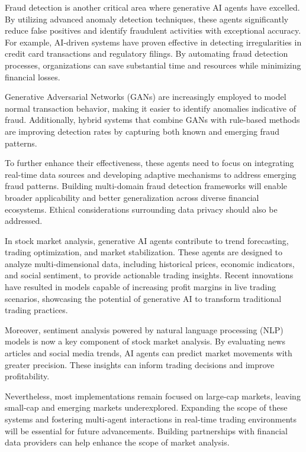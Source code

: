 \documentclass[a4paper,12pt]{scrbook}
\begin{document}
	Fraud detection is another critical area where generative AI agents have excelled. By utilizing advanced anomaly detection techniques, these agents significantly reduce false positives and identify fraudulent activities with exceptional accuracy. For example, AI-driven systems have proven effective in detecting irregularities in credit card transactions and regulatory filings. By automating fraud detection processes, organizations can save substantial time and resources while minimizing financial losses.
	
	Generative Adversarial Networks (GANs) are increasingly employed to model normal transaction behavior, making it easier to identify anomalies indicative of fraud. Additionally, hybrid systems that combine GANs with rule-based methods are improving detection rates by capturing both known and emerging fraud patterns.
	
	To further enhance their effectiveness, these agents need to focus on integrating real-time data sources and developing adaptive mechanisms to address emerging fraud patterns. Building multi-domain fraud detection frameworks will enable broader applicability and better generalization across diverse financial ecosystems. Ethical considerations surrounding data privacy should also be addressed.
	
	
	In stock market analysis, generative AI agents contribute to trend forecasting, trading optimization, and market stabilization. These agents are designed to analyze multi-dimensional data, including historical prices, economic indicators, and social sentiment, to provide actionable trading insights. Recent innovations have resulted in models capable of increasing profit margins in live trading scenarios, showcasing the potential of generative AI to transform traditional trading practices.
	
	Moreover, sentiment analysis powered by natural language processing (NLP) models is now a key component of stock market analysis. By evaluating news articles and social media trends, AI agents can predict market movements with greater precision. These insights can inform trading decisions and improve profitability.
	
	Nevertheless, most implementations remain focused on large-cap markets, leaving small-cap and emerging markets underexplored. Expanding the scope of these systems and fostering multi-agent interactions in real-time trading environments will be essential for future advancements. Building partnerships with financial data providers can help enhance the scope of market analysis.
	
\end{document}

